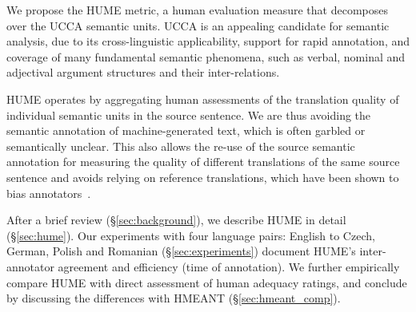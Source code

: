 \documentclass[11pt,letterpaper]{article}
\newcommand{\secref}[1]{\S\ref{#1}}
\newcommand{\XXX}[1]{{\color{red}XXX #1}} %
\def\parcite#1{\cite{#1}}
\begin{document}


We propose the HUME metric,
a human evaluation measure that decomposes over the UCCA semantic units.
UCCA \parcite{abend2013universal} is an appealing candidate for semantic analysis,
due to its cross-linguistic applicability, support for rapid annotation, and coverage
of many fundamental semantic phenomena, such as verbal, nominal and adjectival
argument structures and their inter-relations.

HUME operates by aggregating human assessments of the translation quality of individual
semantic units in the source sentence. We 
are thus avoiding the semantic annotation of machine-generated text,
which is often garbled or semantically unclear.
This also allows the re-use of the source semantic annotation for
measuring the quality of different translations of the same source sentence
and avoids relying on reference translations, 
which have been shown to bias annotators~\cite{fomicheva-specia_ACL:2016}.


After a brief review (\secref{sec:background}), we describe HUME in detail
(\secref{sec:hume}). 
Our experiments with four language pairs: English to Czech, German, Polish and Romanian (\secref{sec:experiments}) document HUME's inter-annotator agreement and efficiency (time of annotation). We further empirically compare HUME with direct assessment of human adequacy ratings, and conclude by discussing the differences with HMEANT (\secref{sec:hmeant_comp}).
\end{document}
